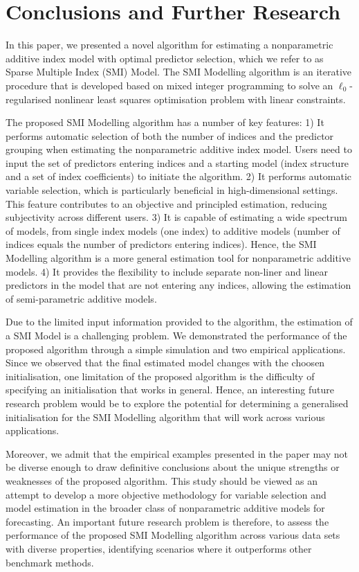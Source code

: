 \documentclass[11pt,a4paper,]{article}
\begin{document}
\hypertarget{sec-conclusion}{%
\section{Conclusions and Further Research}\label{sec-conclusion}}

In this paper, we presented a novel algorithm for estimating a
nonparametric additive index model with optimal predictor selection,
which we refer to as Sparse Multiple Index (SMI) Model. The SMI
Modelling algorithm is an iterative procedure that is developed based on
mixed integer programming to solve an \(\ell_{0}\)-regularised nonlinear
least squares optimisation problem with linear constraints.

The proposed SMI Modelling algorithm has a number of key features: 1) It
performs automatic selection of both the number of indices and the
predictor grouping when estimating the nonparametric additive index
model. Users need to input the set of predictors entering indices and a
starting model (index structure and a set of index coefficients) to
initiate the algorithm. 2) It performs automatic variable selection,
which is particularly beneficial in high-dimensional settings. This
feature contributes to an objective and principled estimation, reducing
subjectivity across different users. 3) It is capable of estimating a
wide spectrum of models, from single index models (one index) to
additive models (number of indices equals the number of predictors
entering indices). Hence, the SMI Modelling algorithm is a more general
estimation tool for nonparametric additive models. 4) It provides the
flexibility to include separate non-liner and linear predictors in the
model that are not entering any indices, allowing the estimation of
semi-parametric additive models.

Due to the limited input information provided to the algorithm, the
estimation of a SMI Model is a challenging problem. We demonstrated the
performance of the proposed algorithm through a simple simulation and
two empirical applications. Since we observed that the final estimated
model changes with the choosen initialisation, one limitation of the
proposed algorithm is the difficulty of specifying an initialisation
that works in general. Hence, an interesting future research problem
would be to explore the potential for determining a generalised
initialisation for the SMI Modelling algorithm that will work across
various applications.

Moreover, we admit that the empirical examples presented in the paper
may not be diverse enough to draw definitive conclusions about the
unique strengths or weaknesses of the proposed algorithm. This study
should be viewed as an attempt to develop a more objective methodology
for variable selection and model estimation in the broader class of
nonparametric additive models for forecasting. An important future
research problem is therefore, to assess the performance of the proposed
SMI Modelling algorithm across various data sets with diverse
properties, identifying scenarios where it outperforms other benchmark
methods.
\end{document}
